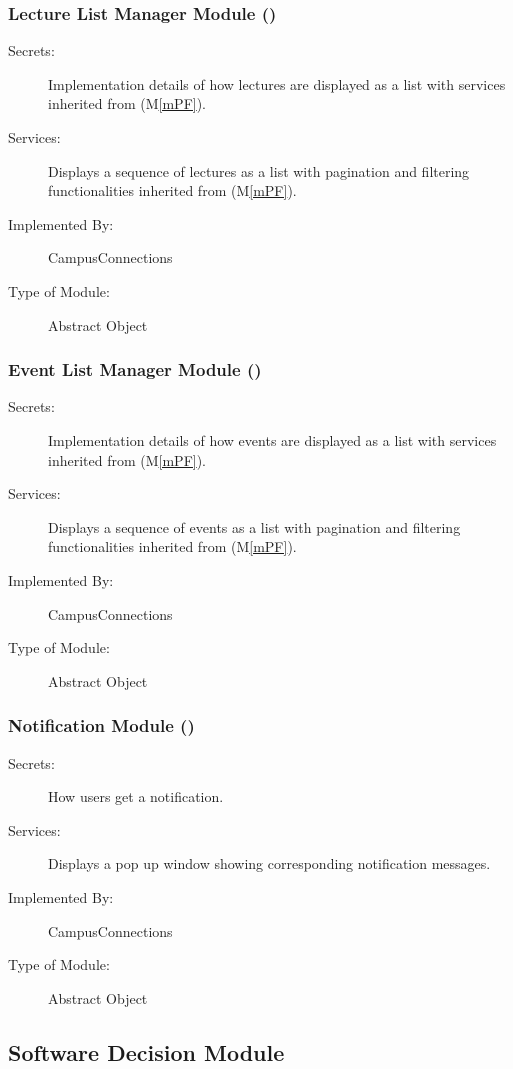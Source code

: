 \documentclass[12pt, titlepage]{article}
\newcommand{\mref}[1]{M\ref{#1}}
\begin{document}
  \subsubsection{Lecture List Manager Module (\label{mLL})}
  \begin{description}
  \item[Secrets:]Implementation details of how lectures are displayed as a list with services inherited from (\mref{mPF}).
  \item[Services:]Displays a sequence of lectures as a list with pagination and filtering functionalities inherited from (\mref{mPF}).
  \item[Implemented By:] CampusConnections
  \item[Type of Module:] Abstract Object
  \end{description}
  
  \subsubsection{Event List Manager Module (\label{mEL})}
  \begin{description}
  \item[Secrets:]Implementation details of how events are displayed as a list with services inherited from (\mref{mPF}).
  \item[Services:]Displays a sequence of events as a list with pagination and filtering functionalities inherited from (\mref{mPF}).
  \item[Implemented By:] CampusConnections
  \item[Type of Module:] Abstract Object
  \end{description}
  
  \subsubsection{Notification Module (\label{mNoti})}
  \begin{description}
  \item[Secrets:] How users get a notification.
  \item[Services:]Displays a pop up window showing corresponding notification messages.
  \item[Implemented By:] CampusConnections
  \item[Type of Module:] Abstract Object
  \end{description}
  
  \subsection{Software Decision Module}
\end{document}
